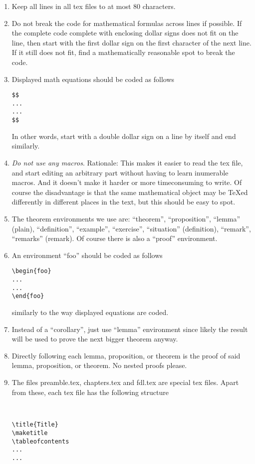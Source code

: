 \begin{enumerate}
\item Keep all lines in all tex files to at most 80 characters.
\item Do not break the code for mathematical formulas across
lines if possible. If the complete code complete with enclosing
dollar signs does not fit on the line, then start with the first
dollar sign on the first character of the next line. If it still
does not fit, find a mathematically reasonable spot to break
the code.
\item Displayed math equations should be coded as follows
\begin{verbatim}
$$
...
...
$$
\end{verbatim}
In other words, start with a double dollar sign on a line by itself
and end similarly.
\item {\it Do not use any macros}. Rationale: This makes it easier
to read the tex file, and start editing an arbitrary part
without having to learn inumerable macros.
And it doesn't make it harder or more timeconsuming to write.
Of course the disadvantage is that the same mathematical object
may be TeXed differently in different places in the text, but
this should be easy to spot.
\item The theorem environments we use are:
``theorem'', ``proposition'', ``lemma'' (plain),
``definition'', ``example'', ``exercise'', ``situation'' (definition),
``remark'', ``remarks'' (remark). Of course there is also
a ``proof'' environment.
\item An environment ``foo'' should be coded as follows
\begin{verbatim}
\begin{foo}
...
...
\end{foo}
\end{verbatim}
similarly to the way displayed equations are coded.
\item Instead of a ``corollary'', just use ``lemma'' environment
since likely the result will be used to prove the next bigger
theorem anyway.
\item Directly following each lemma, proposition, or theorem
is the proof of said lemma, proposition, or theorem. No nested
proofs please.
\item The files preamble.tex, chapters.tex and fdl.tex are special
tex files. Apart from these, each tex file
has the following structure
\begin{verbatim}


\title{Title}
\maketitle
\tableofcontents
...
...





\end{verbatim}
\end{enumerate}
